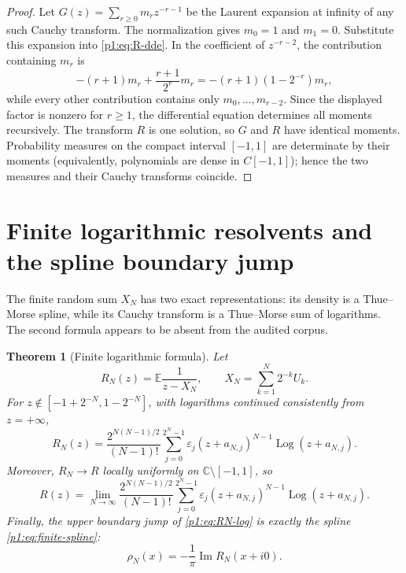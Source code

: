 \documentclass[11pt]{article}
\newtheorem{theorem}{Theorem}[section]
\theoremstyle{definition}
\theoremstyle{remark}
\newcommand{\C}{\mathbb C}
\newcommand{\E}{\mathbb E}
\newcommand{\eps}{\varepsilon}
\newcommand{\Log}{\operatorname{Log}}
\begin{document}
\begin{proof}
Let \(G(z)=\sum_{r\ge0}m_r z^{-r-1}\) be the Laurent expansion at infinity of any such
Cauchy transform.  The normalization gives \(m_0=1\) and \(m_1=0\).  Substitute this
expansion into \eqref{p1:eq:R-dde}.  In the coefficient of \(z^{-r-2}\), the contribution
containing \(m_r\) is
\[
 -(r+1)m_r+\frac{r+1}{2^r}m_r
 =-(r+1)(1-2^{-r})m_r,
\]
while every other contribution contains only \(m_0,\ldots,m_{r-2}\).  Since the displayed
factor is nonzero for \(r\ge1\), the differential equation determines all moments
recursively.  The transform \(R\) is one solution, so \(G\) and \(R\) have identical
moments.  Probability measures on the compact interval \([-1,1]\) are determinate by their
moments (equivalently, polynomials are dense in \(C[-1,1]\)); hence the two measures and
their Cauchy transforms coincide.
\end{proof}

\section{Finite logarithmic resolvents and the spline boundary jump}

The finite random sum \(X_N\) has two exact representations: its density is a
Thue--Morse spline, while its Cauchy transform is a Thue--Morse sum of logarithms.  The
second formula appears to be absent from the audited corpus.

\begin{theorem}[Finite logarithmic formula]\label{p1:thm:finite-log}
Let
\[
 R_N(z)=\E\frac1{z-X_N},
 \qquad X_N=\sum_{k=1}^{N}2^{-k}U_k.
\]
For \(z\notin[-1+2^{-N},1-2^{-N}]\), with logarithms continued consistently from
\(z=+\infty\),
\begin{equation}
 \boxed{
 R_N(z)=\frac{2^{N(N-1)/2}}{(N-1)!}
 \sum_{j=0}^{2^N-1}\eps_j
 (z+a_{N,j})^{N-1}\Log(z+a_{N,j}).
 }                                                           \label{p1:eq:RN-log}
\end{equation}
Moreover, \(R_N\to R\) locally uniformly on \(\C\setminus[-1,1]\), so
\begin{equation}
 R(z)=\lim_{N\to\infty}\frac{2^{N(N-1)/2}}{(N-1)!}
 \sum_{j=0}^{2^N-1}\eps_j
 (z+a_{N,j})^{N-1}\Log(z+a_{N,j}).                           \label{p1:eq:R-log-limit}
\end{equation}
Finally, the upper boundary jump of \eqref{p1:eq:RN-log} is exactly the spline
\eqref{p1:eq:finite-spline}:
\begin{equation}
 \rho_N(x)=-\frac1\pi\operatorname{Im}R_N(x+i0).
                                                                    \label{p1:eq:RN-boundary}
\end{equation}
\end{theorem}
\end{document}
